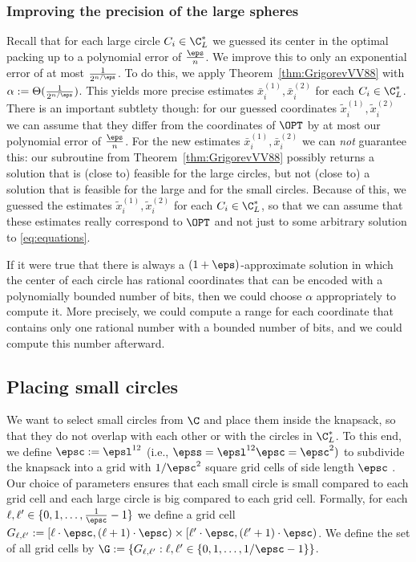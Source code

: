 \documentclass[10pt,a4paper]{article}
\theoremstyle{plain}
\theoremstyle{plain}
\theoremstyle{plain}
\theoremstyle{definition}
\begin{document}
{\subsubsection{Improving the precision of the large spheres}
\label{subsec:Improve_Large} Recall that for each large circle $C_{i}\in\C_{L}^{*}$
we guessed its center in the optimal packing up to a polynomial error
of $\frac{\eps}{n}$. We improve this to only an exponential error
of at most $\frac{1}{2^{n/\eps}}$. To do this, we apply Theorem~\ref{thm:GrigorevVV88}
with $\alpha:=\Theta(\frac{1}{2^{n/\eps}})$. This yields more precise
estimates $\bar{x}_{i}^{(1)},\bar{x}_{i}^{(2)}$ for each $C_{i}\in\C_{L}^{*}$.
There is an important subtlety though: for our guessed coordinates
$\tilde{x}_{i}^{(1)},\tilde{x}_{i}^{(2)}$ we can assume that they
differ from the coordinates of $\OPT$ by at most our polynomial error
of $\frac{\eps}{n}$. For the new estimates $\bar{x}_{i}^{(1)},\bar{x}_{i}^{(2)}$
we can \emph{not }guarantee this: our subroutine from Theorem~\ref{thm:GrigorevVV88}
possibly returns a solution that is (close to) feasible for the
large circles, but not (close to) a solution that is feasible for
the large and for the small circles. Because of this, we guessed the estimates
$\tilde{x}_{i}^{(1)},\tilde{x}_{i}^{(2)}$ for each $C_{i}\in\C_{L}^{*}$,
so that we can assume that these estimates really correspond to $\OPT$
and not just to some arbitrary solution to \eqref{eq:equations}.

If it were true that there is always a $(1+\eps)$-approximate solution
in which the center of each circle has rational coordinates that can
be encoded with a polynomially bounded number of bits, then we could
choose $\alpha$ appropriately to compute it. More precisely, we could
compute a range for each coordinate that contains only one rational
number with a bounded number of bits, and we could compute this number
afterward.


\subsection{Placing small circles}\label{subsec:placing_small}

We want to select small circles from $\C$ and place them inside the
knapsack, so that they do not overlap with each other or
with the circles in $\C_{L}^{*}$. To this end, we define $\epsc := \epsl^{12}$ (i.e., $\epss=\epsl^{12} \epsc = \epsc^2)$ to subdivide the knapsack
into a grid with $1/\epsc^2$ square grid cells of side length $\epsc$ . Our choice of parameters ensures that each small circle is small compared to each grid
cell and each large circle is big compared to each grid cell. Formally, for each $\ell,\ell'\in\{0,1, \dots ,\frac{1}{\epsc}-1\}$
we define a grid cell $G_{\ell,\ell'}:=[\ell\cdot\epsc,(\ell+1)\cdot\epsc)\times[\ell'\cdot\epsc,(\ell'+1)\cdot\epsc)$.
We define the set of all grid cells by $\G:=\{G_{\ell,\ell'}:\ell,\ell'\in\{0,1, \dots ,1/\epsc-1\}\}$.

}
\end{document}
